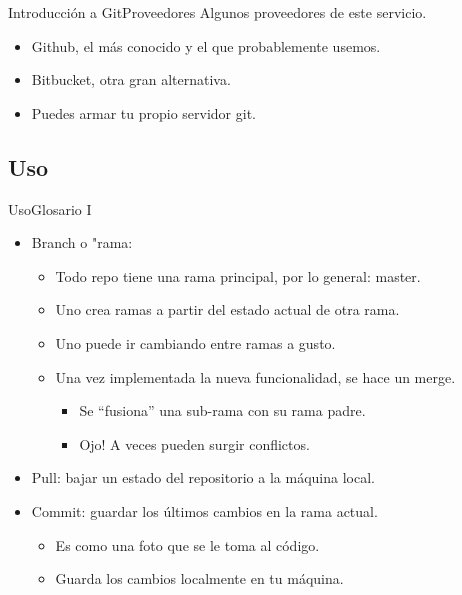 \documentclass[spanish]{beamer}
\begin{document}
\begin{frame}{Introducción a Git}{Proveedores}
    Algunos proveedores de este servicio.
    \begin{itemize}
        \item \alert{Github}, el más conocido y el que probablemente usemos.
        \item \alert{Bitbucket}, otra gran alternativa. 
        \pause
        \item Puedes armar tu propio servidor git.
    \end{itemize}
\end{frame}    

\subsection{Uso}
\begin{frame}{Uso}{Glosario I}
    \begin{itemize}
        \item \alert{Branch} o \alert{"rama}:
            \begin{itemize}
            \item Todo repo tiene una rama principal, por lo general: \alert{master}.
            \item Uno crea ramas a partir del estado actual de otra rama.
            \item Uno puede ir cambiando entre ramas a gusto.
            \item Una vez implementada la nueva funcionalidad, se hace un \alert{merge}.
                \begin{itemize}
                    \item Se ``fusiona'' una sub-rama con su rama padre.
                    \item Ojo! A veces pueden surgir conflictos.
                \end{itemize}
            \end{itemize}
        \item \alert{Pull}: bajar un estado del repositorio a la máquina local.
        \item \alert{Commit}: guardar los últimos cambios en la rama actual.
            \begin{itemize}
            \item Es como una foto que se le toma al código.
            \item Guarda los cambios localmente en tu máquina.
            \end{itemize}
    \end{itemize}
\end{frame}
\end{document}
